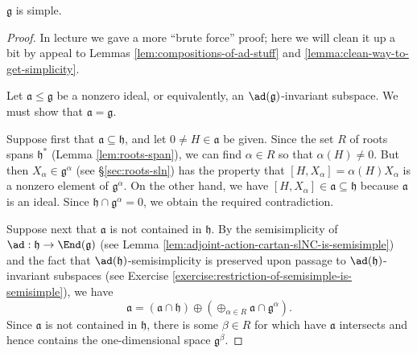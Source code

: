 \documentclass[reqno]{amsart} 
\begin{document}
\begin{theorem}\label{thm:simplicity-slNC}
  $\mathfrak{g}$ is simple.
\end{theorem}
\begin{proof}
  In lecture we gave a more ``brute force'' proof; here we will clean it up a bit by appeal to Lemmas \ref{lem:compositions-of-ad-stuff} and \ref{lemma:clean-way-to-get-simplicity}.

  Let $\mathfrak{a} \leq \mathfrak{g}$ be a nonzero ideal, or equivalently, an $\ad(\mathfrak{g})$-invariant subspace.  We must show that $\mathfrak{a} = \mathfrak{g}$.

  Suppose first that $\mathfrak{a} \subseteq \mathfrak{h}$, and let $0 \neq H \in \mathfrak{a}$ be given.  Since the set $R$ of roots spans $\mathfrak{h}^*$ (Lemma \ref{lem:roots-span}), we can find $\alpha \in R$ so that $\alpha(H) \neq 0$.  But then $X_\alpha \in \mathfrak{g}^\alpha$ (see \S\ref{sec:roots-sln}) has the property that $[H,X_\alpha] = \alpha(H) X_\alpha$ is a nonzero element of $\mathfrak{g}^\alpha$.  On the other hand, we have $[H,X_\alpha] \in \mathfrak{a} \subseteq \mathfrak{h}$ because $\mathfrak{a}$ is an ideal.  Since $\mathfrak{h} \cap \mathfrak{g}^\alpha = 0$, we obtain the required contradiction.

  Suppose next that $\mathfrak{a}$ is not contained in $\mathfrak{h}$.  By the semisimplicity of $\ad : \mathfrak{h} \rightarrow \End(\mathfrak{g})$ (see Lemma \ref{lem:adjoint-action-cartan-slNC-is-semisimple}) and the fact that $\ad(\mathfrak{h})$-semisimplicity is preserved upon passage to $\ad(\mathfrak{h})$-invariant subspaces (see Exercise \ref{exercise:restriction-of-semisimple-is-semisimple}), we have
  \begin{equation}
    \mathfrak{a} = (\mathfrak{a} \cap \mathfrak{h})
    \oplus (\oplus_{\alpha \in R}
    \mathfrak{a} \cap \mathfrak{g}^\alpha ).
  \end{equation}
  Since $\mathfrak{a}$ is not contained in $\mathfrak{h}$, there is some $\beta \in R$ for which have $\mathfrak{a}$ intersects and hence contains the one-dimensional space $\mathfrak{g}^\beta$.


\end{proof}
\end{document}
